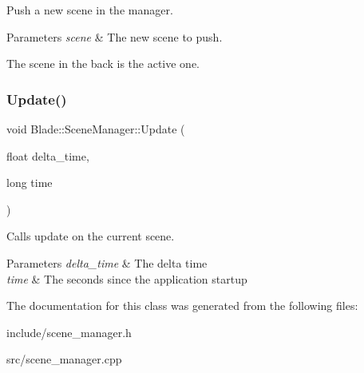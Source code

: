 Push a new scene in the manager. 


\begin{DoxyParams}{Parameters}
{\em scene} & The new scene to push.\\
\hline
\end{DoxyParams}
The scene in the back is the active one. \mbox{\label{class_blade_1_1_scene_manager_a68f1c083b875be3634870758ee697792}} 
\subsubsection{\texorpdfstring{Update()}{Update()}}
{\footnotesize\ttfamily void Blade\+::\+Scene\+Manager\+::\+Update (\begin{DoxyParamCaption}\item[{float}]{delta\+\_\+time,  }\item[{long}]{time }\end{DoxyParamCaption})\hspace{0.3cm}{\ttfamily [noexcept]}}



Calls update on the current scene. 


\begin{DoxyParams}{Parameters}
{\em delta\+\_\+time} & The delta time \\
\hline
{\em time} & The seconds since the application startup \\
\hline
\end{DoxyParams}


The documentation for this class was generated from the following files\+:\begin{DoxyCompactItemize}
\item 
include/scene\+\_\+manager.\+h\item 
src/scene\+\_\+manager.\+cpp\end{DoxyCompactItemize}
